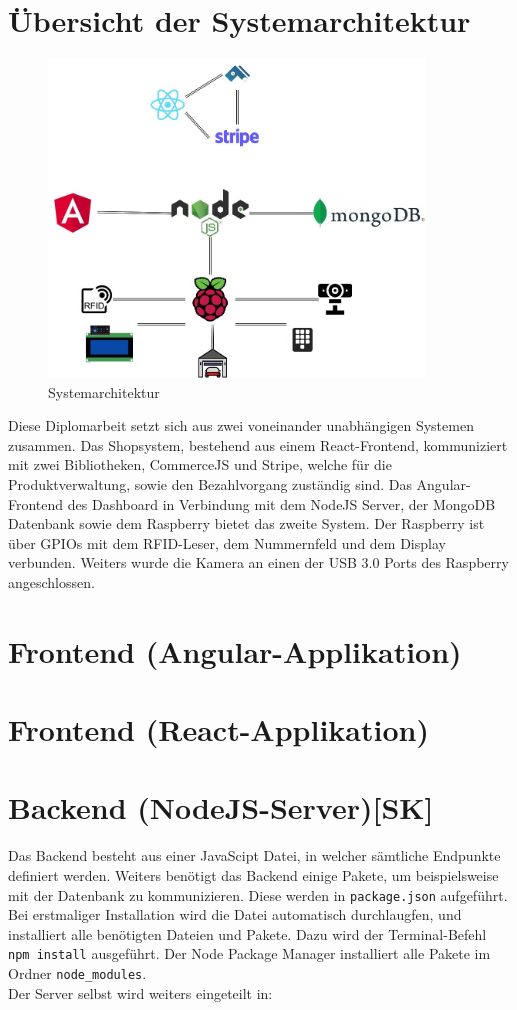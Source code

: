 \section{Übersicht der Systemarchitektur}
\begin{figure}[h]
    \centering
    \includegraphics[width=10cm]{pics/APERTASystemarchitektur.jpg}
    \caption{Systemarchitektur}
    \end{figure}
Diese Diplomarbeit setzt sich aus zwei voneinander unabhängigen Systemen zusammen. Das Shopsystem, bestehend aus einem React-Frontend, kommuniziert mit zwei Bibliotheken, CommerceJS und Stripe, welche für die Produktverwaltung, sowie den Bezahlvorgang zuständig sind. Das Angular-Frontend des Dashboard in Verbindung mit dem NodeJS Server, der MongoDB Datenbank sowie dem Raspberry bietet das zweite System.
Der Raspberry ist über GPIOs mit dem RFID-Leser, dem Nummernfeld und dem Display verbunden. Weiters wurde die Kamera an einen der USB 3.0 Ports des Raspberry angeschlossen.
\section{Frontend (Angular-Applikation)}

\section{Frontend (React-Applikation)}

\section{Backend (NodeJS-Server)[SK]}
Das Backend besteht aus einer JavaScipt Datei, in welcher sämtliche Endpunkte definiert werden. Weiters benötigt das Backend einige Pakete, um beispielsweise mit der Datenbank zu kommunizieren. Diese werden in \verb|package.json| aufgeführt. Bei erstmaliger Installation wird die Datei automatisch durchlaugfen, und installiert alle benötigten Dateien und Pakete. Dazu wird der Terminal-Befehl \verb|npm install| ausgeführt. Der Node Package Manager installiert alle Pakete im Ordner \verb|node_modules|.\\
Der Server selbst wird weiters eingeteilt in:

